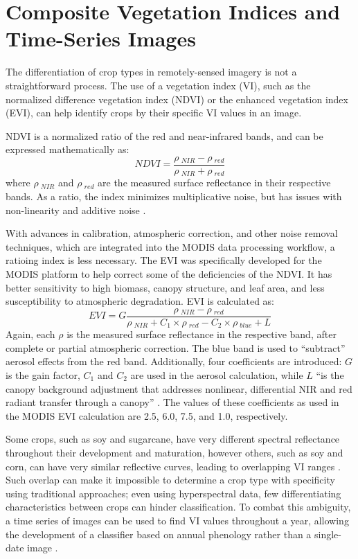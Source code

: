 \section{Composite Vegetation Indices and Time-Series Images}

The differentiation of crop types in remotely-sensed imagery is not a straightforward process. The use of a vegetation index (VI), such as the normalized difference vegetation index (NDVI) or the enhanced vegetation index (EVI), can help identify crops by their specific VI values in an image.

NDVI is a normalized ratio of the red and near-infrared bands, and can be expressed mathematically as:
\begin{equation}
  NDVI = \frac{\rho~_{NIR} - \rho~_{red}}{\rho~_{NIR} + \rho~_{red}}
\end{equation}
where $\rho~_{NIR}$ and $\rho~_{red}$ are the measured surface reflectance in their respective bands. As a ratio, the index minimizes multiplicative noise, but has issues with non-linearity and additive noise \autocite{huete2002overview}.

With advances in calibration, atmospheric correction, and other noise removal techniques, which are integrated into the MODIS data processing workflow, a ratioing index is less necessary. The EVI was specifically developed for the MODIS platform to help correct some of the deficiencies of the NDVI. It has better sensitivity to high biomass, canopy structure, and leaf area, and less susceptibility to atmospheric degradation. EVI is calculated as:
\begin{equation}
  EVI = G\frac{\rho~_{NIR} - \rho~_{red}}{\rho~_{NIR} +  C_1\times\rho~_{red} - C_2 \times \rho~_{blue} + L}
\end{equation}
Again, each $\rho$ is the measured surface reflectance in the respective band, after complete or partial atmospheric correction. The blue band is used to ``subtract'' aerosol effects from the red band. Additionally, four coefficients are introduced: $G$ is the gain factor, $C_1$ and $C_2$ are used in the aerosol calculation, while $L$ ``is the canopy background adjustment that addresses nonlinear, differential NIR and red radiant transfer through a canopy'' \citereset\autocite[196]{huete2002overview}. The values of these coefficients as used in the MODIS EVI calculation are 2.5, 6.0, 7.5, and 1.0, respectively.

Some crops, such as soy and sugarcane, have very different spectral reflectance throughout their development and maturation, however others, such as soy and corn, can have very similar reflective curves, leading to overlapping VI ranges \autocite{price1994how-unique}. Such overlap can make it impossible to determine a crop type with specificity using traditional approaches; even using hyperspectral data, few differentiating characteristics between crops can hinder classification. To combat this ambiguity, a time series of images can be used to find VI values throughout a year, allowing the development of a classifier based on annual phenology rather than a single-date image \autocites{gu2010phenological}{wardlow2002discriminating}{wardlow2005state-level}{wardlow2007analysis}{wardlow2008large-area}{zhang2003monitoring}.
	
